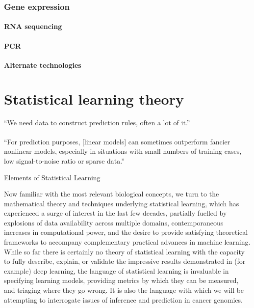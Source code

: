 \documentclass[thesis.tex]{subfiles}
\begin{document}
\subsubsection{Gene expression}
\paragraph{RNA sequencing}
\paragraph{PCR}
\paragraph{Alternate technologies}



\section{Statistical learning theory} \label{sec:statistical_learning}
\epigraph{``We need data to construct prediction rules, often a lot of it.'' \\
~\\
``For prediction purposes, [linear models] can sometimes outperform fancier
nonlinear models, especially in situations with small numbers of training
cases, low signal-to-noise ratio or sparse data.''}{Elements of Statistical Learning \\
\citep{hastie_elements_2009}}

Now familiar with the most relevant biological concepts, we turn to the mathematical theory and techniques underlying statistical learning, which has experienced a surge of interest in the last few decades, partially fuelled by explosions of data availability across multiple domains, contemporaneous increases in computational power, and the desire to provide satisfying theoretical frameworks to accompany complementary practical advances in machine learning. While so far there is certainly no theory of statistical learning with the capacity to fully describe, explain, or validate the impressive results demonstrated in (for example) deep learning, the language of statistical learning is invaluable in specifying learning models, providing metrics by which they can be measured, and triaging where they go wrong. It is also the language with which we will be attempting to interrogate issues of inference and prediction in cancer genomics. 
\end{document}
